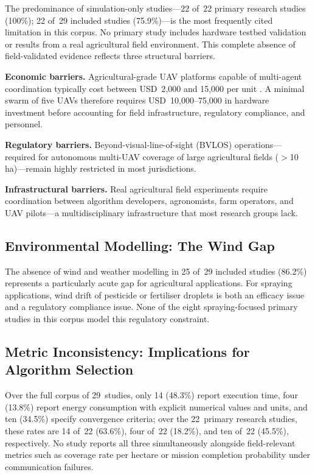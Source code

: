 \documentclass[review,3p]{elsarticle}
\begin{document}
The predominance of simulation-only studies---22 of~22 primary research studies
(100\%); 22 of~29 included studies (75.9\%)---is the most frequently cited
limitation in this corpus. No primary study includes hardware testbed validation
or results from a real agricultural field environment. This complete absence of
field-validated evidence reflects three structural barriers.

\textbf{Economic barriers.} Agricultural-grade UAV platforms capable of
multi-agent coordination typically cost between USD~2{,}000 and 15{,}000 per
unit \cite{phung2021}. A minimal swarm of five UAVs therefore requires
USD~10{,}000--75{,}000 in hardware investment before accounting for field
infrastructure, regulatory compliance, and personnel.

\textbf{Regulatory barriers.} Beyond-visual-line-of-sight (BVLOS)
operations---required for autonomous multi-UAV coverage of large agricultural
fields ($>$10\,ha)---remain highly restricted in most jurisdictions.

\textbf{Infrastructural barriers.} Real agricultural field experiments require
coordination between algorithm developers, agronomists, farm operators, and UAV
pilots---a multidisciplinary infrastructure that most research groups lack.

\subsection{Environmental Modelling: The Wind Gap}
\label{sec:envmodel}

The absence of wind and weather modelling in 25 of~29 included studies (86.2\%)
represents a particularly acute gap for agricultural applications. For spraying
applications, wind drift of pesticide or fertiliser droplets is both an efficacy
issue and a regulatory compliance issue. None of the eight spraying-focused
primary studies in this corpus model this regulatory constraint.

\subsection{Metric Inconsistency: Implications for Algorithm Selection}
\label{sec:metrics_disc}

Over the full corpus of 29~studies, only 14 (48.3\%) report execution time,
four (13.8\%) report energy consumption with explicit numerical values and units,
and ten (34.5\%) specify convergence criteria; over the 22~primary research
studies, these rates are 14 of~22 (63.6\%), four of~22 (18.2\%), and ten of~22
(45.5\%), respectively. No study reports all three simultaneously alongside
field-relevant metrics such as coverage rate per hectare or mission completion
probability under communication failures.
\end{document}

